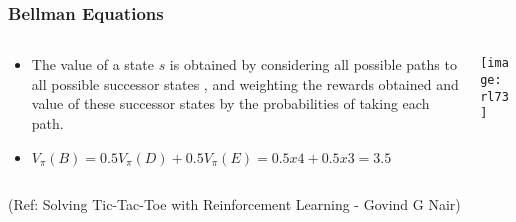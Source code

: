 \begin{frame}[fragile]\frametitle{Bellman Equations}


\begin{columns}
\begin{column}{0.5\textwidth}
\begin{itemize}
\item The value of a state $s$  is obtained by considering all possible paths to all possible successor states , and weighting the rewards obtained and value of these successor states by the probabilities of taking each path.
\item $V_{\pi}(B) = 0.5V_{\pi}(D) + 0.5V_{\pi}(E) = 0.5 x 4+ 0.5 x 3 = 3.5$
\end{itemize}

\end{column}
\begin{column}{0.5\textwidth}  %
\begin{center}
\texttt{[image: rl73]}
\end{center}
\end{column}
\end{columns}

{\tiny (Ref: Solving Tic-Tac-Toe with Reinforcement Learning - Govind G Nair)}

\end{frame}


